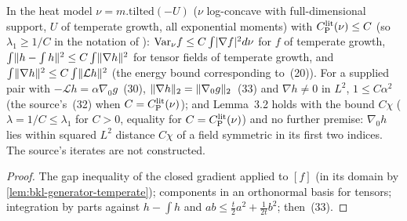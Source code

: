 \begin{lemma}
  \label{lem:bkl-poincare-temperate}
  \leanok
  In the heat model $\nu=m.\mathrm{tilted}(-U)$ ($\nu$ log-concave with full-dimensional support, $U$ of
  temperate growth, all exponential moments) with $C_{\mathrm P}^{\mathrm{lit}}(\nu)\le C$ (so $\lambda_1\ge1/C$ in the notation
  of \cite{BizeulKlartagLehec2026}): $\mathrm{Var}_\nu f\le C\int\lvert\nabla f\rvert^2d\nu$ for $f$ of temperate
  growth, $\int\lVert h-\int h\rVert^2\le C\int\lVert\nabla h\rVert^2$ for tensor fields of temperate growth, and
  $\int\lVert\nabla h\rVert^2\le C\int\lVert\mathcal Lh\rVert^2$ (the energy bound corresponding to~(20)).  For a supplied pair with
  $-\mathcal Lh=\alpha\nabla_0g$~(30), $\lVert\nabla h\rVert_2=\lVert\nabla_0g\rVert_2$~(33) and $\nabla h\ne0$ in
  $L^2$, $1\le C\alpha^2$ (the source's~(32) when $C=C_{\mathrm P}^{\mathrm{lit}}(\nu)$); and Lemma~3.2 holds with the bound
  $C\chi$ ($\lambda=1/C\le\lambda_1$ for $C>0$, equality for $C=C_{\mathrm P}^{\mathrm{lit}}(\nu)$) and no further premise: $\nabla_0h$ lies within squared $L^2$ distance $C\chi$ of a field symmetric in its first two
  indices.  The source's iterates are not constructed.
\end{lemma}
\begin{proof}
  \leanok
  The gap inequality of the closed gradient applied to $[f]$ (in its domain by
  \cref{lem:bkl-generator-temperate}); components in an orthonormal basis for tensors; integration by parts
  against $h-\int h$ and $ab\le\frac t2a^2+\frac1{2t}b^2$; then~(33).
\end{proof}

